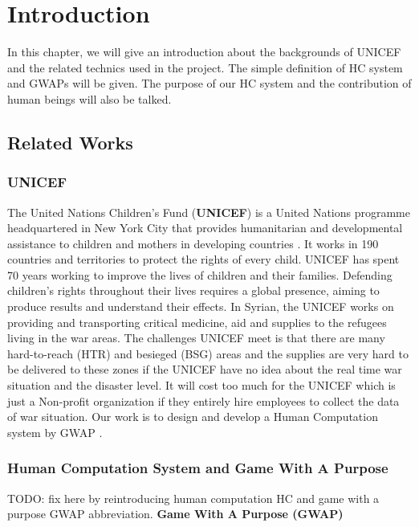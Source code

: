 \section{Introduction}

In this chapter, we will give an introduction about the backgrounds of UNICEF and the related technics 
used in the project. The simple definition of HC system and GWAPs will be given. 
The purpose of our HC system and the contribution of human beings will also be talked.

\subsection{Related Works}

\subsubsection{UNICEF}
The United Nations Children's Fund (\textbf{UNICEF\label{idx:unicef}}) \cite{unicef1994state} is a United Nations programme headquartered
in New York City that provides humanitarian and developmental assistance to 
children and mothers in developing countries \cite{wiki:UNICEF}.
It works in 190 countries and territories to protect the rights of every child. 
UNICEF has spent 70 years working to improve the lives of children and their families. 
Defending children's rights throughout their lives requires a global presence, 
aiming to produce results and understand their effects. 
In Syrian, the UNICEF works on providing and transporting critical medicine, 
aid and supplies to the refugees living in the war areas. The challenges UNICEF meet is that 
there are many hard-to-reach (HTR) and besieged (BSG) areas and the supplies are 
very hard to be delivered to these zones if the UNICEF have no idea about 
the real time war situation and the disaster level. It will cost too much for the UNICEF 
which is just a Non-profit organization if they entirely hire employees to 
collect the data of war situation. 
Our work is to design and develop a Human Computation system by GWAP \cite{lafourcade2015games}.

\subsubsection{Human Computation System and Game With A Purpose}

TODO: fix here by reintroducing human computation HC and game with a purpose GWAP abbreviation.
\textbf{Game With A Purpose (GWAP)\label{idx:gwap}}

